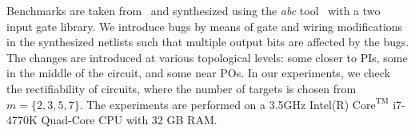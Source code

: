 Benchmarks are taken from~\cite{lv:tcad2013} and synthesized using the {\it abc} tool~\cite{abc} with a 
two input gate library.
We introduce bugs by means of gate and wiring modifications in the synthesized netlists such that multiple 
output bits are affected by the bugs.
The changes are introduced at various topological levels: some closer to PIs, some in the middle of the
circuit, and some near POs. In our experiments, we check the rectifiability of circuits, where the number of targets
is chosen from $m=\{2,3,5,7\}$. 
The experiments are performed on a 3.5GHz 
Intel(R) $\text{Core}^{\text{TM}}$ i7-4770K Quad-Core CPU with 32 GB RAM.

